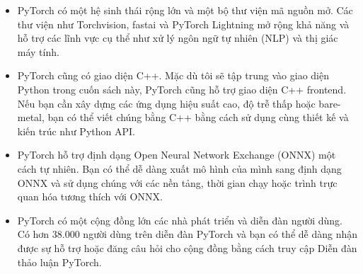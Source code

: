 \documentclass[../main.tex]{subfiles}
\begin{document}
\begin{itemize}
    \item PyTorch có một hệ sinh thái rộng lớn và một bộ thư viện mã nguồn mở. Các thư viện như Torchvision, fastai và PyTorch Lightning mở rộng khả năng và hỗ trợ các lĩnh vực cụ thể như xử lý ngôn ngữ tự nhiên (NLP) và thị giác máy tính.
    \item PyTorch cũng có giao diện C++. Mặc dù tôi sẽ tập trung vào giao diện Python trong cuốn sách này, PyTorch cũng hỗ trợ giao diện C++ frontend. Nếu bạn cần xây dựng các ứng dụng hiệu suất cao, độ trễ thấp hoặc bare-metal, bạn có thể viết chúng bằng C++ bằng cách sử dụng cùng thiết kế và kiến ​​trúc như Python API.
    \item PyTorch hỗ trợ định dạng Open Neural Network Exchange (ONNX) một cách tự nhiên. Bạn có thể dễ dàng xuất mô hình của mình sang định dạng ONNX và sử dụng chúng với các nền tảng, thời gian chạy hoặc trình trực quan hóa tương thích với ONNX.
    \item PyTorch có một cộng đồng lớn các nhà phát triển và diễn đàn người dùng. Có hơn 38.000 người dùng trên diễn đàn PyTorch và bạn có thể dễ dàng nhận được sự hỗ trợ hoặc đăng câu hỏi cho cộng đồng bằng cách truy cập Diễn đàn thảo luận PyTorch.
\end{itemize}
\end{document}
